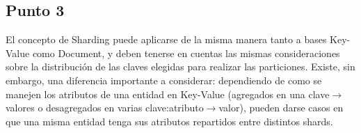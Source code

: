 \subsection{Punto 3}
El concepto de Sharding puede aplicarse de la misma manera tanto a bases Key-Value como Document, y deben tenerse en cuentas
las mismas consideraciones sobre la distribución de las claves elegidas para realizar las particiones. Existe, sin embargo, una diferencia
importante a considerar:
dependiendo de como se manejen los atributos de una entidad en Key-Value (agregados en una clave$\rightarrow$valores o desagregados en varias clave:atributo$\rightarrow$valor), pueden
darse casos en que una misma entidad tenga sus atributos repartidos entre distintos shards.

